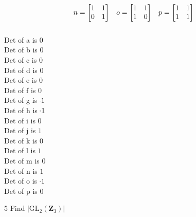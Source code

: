 \begin{mdframed}[style=darkAnswer,frametitle={Joe Starr}]
$$\begin{matrix}
n=\begin{bmatrix}1&1\\0&1\end{bmatrix}&
o=\begin{bmatrix}1&1\\1&0\end{bmatrix}&
p=\begin{bmatrix}1&1\\1&1\end{bmatrix}\\ \hspace{.5in} \\
\end{matrix}
  $$
  Det of a is $  0$\\
  Det of b is $  0$\\
  Det of c is $  0$\\
  Det of d is $  0$\\
  Det of e is $  0$\\
  Det of f is $  0$\\
  Det of g is $\m1$\\
  Det of h is $\m1$\\
  Det of i is $  0$\\
  Det of j is $  1$\\
  Det of k is $  0$\\
  Det of l is $  1$\\
  Det of m is $  0$\\
  Det of n is $  1$\\
  Det of o is $\m1$\\
  Det of p is $  0$\\
\end{mdframed}
\newpage
\begin{mdframed}[style=darkQuesion]
  5 Find $\left|\mathrm{GL}_{2}\left(\mathbf{Z}_{3}\right)\right|$
\end{mdframed}
